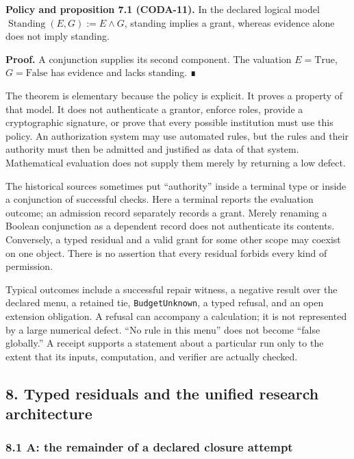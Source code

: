 \documentclass[
  11pt,
]{article}
\begin{document}
\textbf{Policy and proposition 7.1 (CODA-11).} In the declared logical model \(\operatorname{Standing}(E,G):=E\land G\), standing implies a grant, whereas evidence alone does not imply standing.

\textbf{Proof.} A conjunction supplies its second component. The valuation \(E=\mathrm{True}\), \(G=\mathrm{False}\) has evidence and lacks standing. ∎

The theorem is elementary because the policy is explicit. It proves a property of that model. It does not authenticate a grantor, enforce roles, provide a cryptographic signature, or prove that every possible institution must use this policy. An authorization system may use automated rules, but the rules and their authority must then be admitted and justified as data of that system. Mathematical evaluation does not supply them merely by returning a low defect.

The historical sources sometimes put ``authority'' inside a terminal type or inside a conjunction of successful checks. Here a terminal reports the evaluation outcome; an admission record separately records a grant. Merely renaming a Boolean conjunction as a dependent record does not authenticate its contents. Conversely, a typed residual and a valid grant for some other scope may coexist on one object. There is no assertion that every residual forbids every kind of permission.

Typical outcomes include a successful repair witness, a negative result over the declared menu, a retained tie, \texttt{BudgetUnknown}, a typed refusal, and an open extension obligation. A refusal can accompany a calculation; it is not represented by a large numerical defect. ``No rule in this menu'' does not become ``false globally.'' A receipt supports a statement about a particular run only to the extent that its inputs, computation, and verifier are actually checked.

\subsection{8. Typed residuals and the unified research architecture}\label{typed-residuals-and-the-unified-research-architecture}

\subsubsection{8.1 A: the remainder of a declared closure attempt}\label{a-the-remainder-of-a-declared-closure-attempt}
\end{document}
